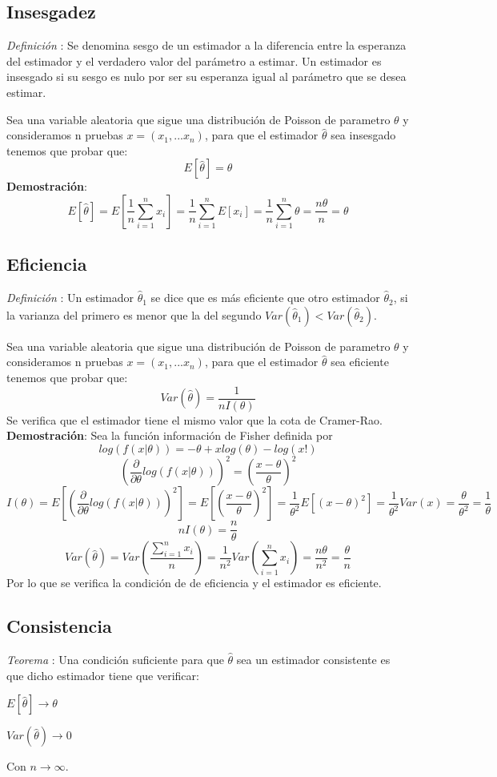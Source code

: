 \documentclass[a4paper, 10pt]{article} %
\newcounter{def}
\newcounter{teo}
\begin{document}
\subsection{Insesgadez}
\addtocounter{def}{1}
\emph{Definición }: Se denomina sesgo de un estimador a la diferencia entre la esperanza del estimador y el verdadero valor del parámetro a estimar. Un estimador es insesgado si su sesgo es nulo por ser su esperanza igual al parámetro que se desea estimar.

Sea una variable aleatoria que sigue una distribución de Poisson de parametro $\theta$ y consideramos n pruebas $x=(x_1,...x_n)$, para que el estimador $\hat{\theta}$ sea insesgado tenemos que probar que:
$$E[\hat{\theta}]=\theta$$
\textbf{Demostración}:
$$E[\hat{\theta}]=E[\frac{1}{n}\sum_{i=1}^{n}x_i]=\frac{1}{n}\sum_{i=1}^{n}E[x_i]=\frac{1}{n}\sum_{i=1}^{n}\theta=\frac{n\theta}{n}=\theta$$
\subsection{Eficiencia}
\addtocounter{def}{1}
\emph{Definición }: Un estimador $\hat{\theta}_1$ se dice que es más eficiente que otro estimador $\hat{\theta}_2$, si la varianza del primero es menor que la del segundo $Var(\hat{\theta}_1)<Var(\hat{\theta}_2)$.

Sea una variable aleatoria que sigue una distribución de Poisson de parametro $\theta$ y consideramos n pruebas $x=(x_1,...x_n)$, para que el estimador $\hat{\theta}$ sea eficiente tenemos que probar que:
$$Var(\hat{\theta})=\frac{1}{nI(\theta)}$$
Se verifica que el estimador tiene el mismo valor que la cota de Cramer-Rao.\\
\textbf{Demostración}:
Sea la función información de Fisher definida por 
$$log(f(x|\theta))=-\theta + xlog(\theta) -log(x!)$$
$$(\frac{\partial}{\partial\theta}log(f(x|\theta)))^2=(\frac{x-\theta}{\theta})^2$$
$$I(\theta)=E[(\frac{\partial}{\partial\theta}log(f(x|\theta)))^2]=E[(\frac{x-\theta}{\theta})^2]=\frac{1}{\theta^2}E[(x-\theta)^2]=\frac{1}{\theta^2}Var(x)=\frac{\theta}{\theta^2}=\frac{1}{\theta}$$
$$nI(\theta)=\frac{n}{\theta}$$
$$Var(\hat{\theta})=Var(\frac{\sum_{i=1}^{n}x_i}{n})=\frac{1}{n^2}Var(\sum_{i=1}^{n}x_i)=\frac{n\theta}{n^2}=\frac{\theta}{n}$$
Por lo que se verifica la condición de de eficiencia y el estimador es eficiente.
\subsection{Consistencia}
\addtocounter{teo}{1}
\emph{Teorema }: Una condición suficiente para que $\hat{\theta}$ sea un estimador consistente es que dicho estimador tiene que verificar:
\begin{description}
\item $E[\hat{\theta}] \rightarrow \theta$
\item $Var(\hat{\theta}) \rightarrow 0$
\end{description}
Con $n \rightarrow \infty$.
\end{document}
